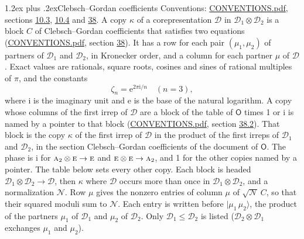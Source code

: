 \documentclass[10pt,a4paper]{article}
\makeatletter
\renewcommand\section{\@startsection{section}{1}{\z@}{-3ex plus -1ex minus -.2ex}%
  {1.2ex plus .2ex}{\normalfont\large\sffamily\bfseries\color{parttitle}}}
\numberwithin{equation}{section}
\newcommand{\grp}[1]{\mathsf{#1}}
\newcommand{\irr}[1]{\text{\normalfont\scshape #1}}
\newcommand{\iunit}{\mathrm{i}}
\newcommand{\expe}{\mathrm{e}}
\newcommand{\rootunity}[1]{\zeta_{#1}}
\newcommand{\irrprod}{\otimes}
\newcommand{\mult}{\kappa}
\newcommand{\intx}{\mu}
\newcommand{\cgnorm}{\mathcal{N}}
\newcommand{\prodket}[2]{\lvert {#1}\,{#2}\rangle}
\makeatother
\begin{document}
\section{Clebsch--Gordan coefficients}\label{s:clebsch_gordan}
Conventions: \href{../../CONVENTIONS.pdf}{CONVENTIONS.pdf}, sections \href{../../../rotation/CONVENTIONS.pdf\#conv.10.3}{10.3}, \href{../../../rotation/CONVENTIONS.pdf\#conv.10.4}{10.4} and \href{../../CONVENTIONS.pdf\#conv.38}{38}.
\leavevmode\label{n:index.copy}\label{n:matrix.cg.stored}A copy $\mult$ of a corepresentation $\mathcal{D}$ in $\mathcal{D}_1\irrprod\mathcal{D}_2$ is a block $C$ of Clebsch--Gordan coefficients that satisfies two equations (\href{../../CONVENTIONS.pdf}{CONVENTIONS.pdf}, section \href{../../CONVENTIONS.pdf\#conv.38}{38}). \label{n:index.cg}It has a row for each pair $(\intx_1, \intx_2)$ of partners of $\mathcal{D}_1$ and $\mathcal{D}_2$, in Kronecker order, and a column for each partner $\intx$ of $\mathcal{D}$.
\leavevmode\label{n:constant.root}\label{n:index.root.order}Exact values are rationals, square roots, cosines and sines of rational multiples of $\pi$, and the constants
\begin{equation}\label{e:constants}\rootunity{n} = \expe^{2\pi\iunit/n}\quad(n = 3),\end{equation}
where $\iunit$ is the imaginary unit and $\expe$ is the base of the natural logarithm.
A copy whose columns of the first irrep of $\mathcal{D}$ are a block of the table of $\grp{O}$ times 1 or $\iunit$ is named by a pointer to that block (\href{../../CONVENTIONS.pdf}{CONVENTIONS.pdf}, section \href{../../CONVENTIONS.pdf\#conv.38.2}{38.2}). That block is the copy $\mult$ of the first irrep of $\mathcal{D}$ in the product of the first irreps of $\mathcal{D}_1$ and $\mathcal{D}_2$, in the section Clebsch--Gordan coefficients of the document of \href{../../../rotation/data/pdf/O.pdf}{$\grp{O}$}. The phase is $\iunit$ for $\irr{a}_{2}\irrprod \irr{e}\to \irr{e}$ and $\irr{e}\irrprod \irr{e}\to \irr{a}_{2}$, and 1 for the other copies named by a pointer. The table below sets every other copy.
Each block is headed $\mathcal{D}_1\irrprod\mathcal{D}_2\to\mathcal{D}$, then $\mult$ where $\mathcal{D}$ occurs more than once in $\mathcal{D}_1\irrprod\mathcal{D}_2$, and a normalization $\cgnorm$. Row $\intx$ gives the nonzero entries of column $\intx$ of $\sqrt{\cgnorm}\,C$, so that their squared moduli sum to $\cgnorm$. \label{n:vector.ket.product}Each entry is written before $\prodket{\intx_1}{\intx_2}$, the product of the partners $\intx_1$ of $\mathcal{D}_1$ and $\intx_2$ of $\mathcal{D}_2$. Only $\mathcal{D}_1 \le \mathcal{D}_2$ is listed ($\mathcal{D}_2\irrprod\mathcal{D}_1$ exchanges $\intx_1$ and $\intx_2$).
\end{document}
